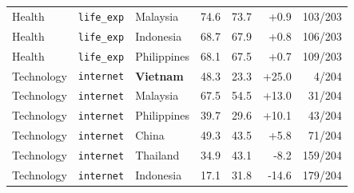 \begin{tabular}{lllrrrr}
Health & \texttt{life\_exp} & Malaysia & 74.6 & 73.7 & +0.9 & 103/203 \\
Health & \texttt{life\_exp} & Indonesia & 68.7 & 67.9 & +0.8 & 106/203 \\
Health & \texttt{life\_exp} & Philippines & 68.1 & 67.5 & +0.7 & 109/203 \\
Technology & \texttt{internet} & \textbf{Vietnam} & 48.3 & 23.3 & +25.0 & 4/204 \\
Technology & \texttt{internet} & Malaysia & 67.5 & 54.5 & +13.0 & 31/204 \\
Technology & \texttt{internet} & Philippines & 39.7 & 29.6 & +10.1 & 43/204 \\
Technology & \texttt{internet} & China & 49.3 & 43.5 & +5.8 & 71/204 \\
Technology & \texttt{internet} & Thailand & 34.9 & 43.1 & -8.2 & 159/204 \\
Technology & \texttt{internet} & Indonesia & 17.1 & 31.8 & -14.6 & 179/204 \\
\bottomrule
\end{tabular}
